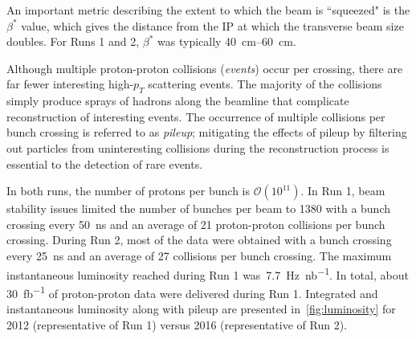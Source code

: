 An important metric describing the extent to which the beam is ``squeezed" is
the $\beta^*$ value, which gives the distance from the IP at which the
transverse beam size doubles. For Runs 1 and 2, $\beta^*$ was typically
\SIrange{40}{60}{\centi\meter}.

Although multiple proton-proton collisions (\textit{events}) occur per crossing,
there are far fewer interesting high-$p_T$ scattering events. The majority of
the collisions simply produce sprays of hadrons along the beamline that
complicate reconstruction of interesting events. The occurrence of multiple
collisions per bunch crossing is referred to as \textit{pileup}; mitigating the
effects of pileup by filtering out particles from uninteresting collisions
during the reconstruction process is essential to the detection of rare events.

In both runs, the number of protons per bunch is $\mathcal{O}(10^{11})$. In Run
1, beam stability issues limited the number of bunches per beam to \num{1380}
with a bunch crossing every \SI{50}{\nano\second} and an average of 21
proton-proton collisions per bunch crossing.  During Run 2, most of the data
were obtained with a bunch crossing every \SI{25}{\nano\second} and an average
of \num{27} collisions per bunch crossing. The maximum instantaneous luminosity
reached during Run 1 was~\SI{7.7}{\hertz\per\nano b}. In total, about
\SI{30}{fb^{-1}} of proton-proton data were delivered during Run 1. Integrated
and instantaneous luminosity along with pileup are presented
in~\cref{fig:luminosity} for 2012 (representative of Run 1) versus 2016
(representative of Run 2).

